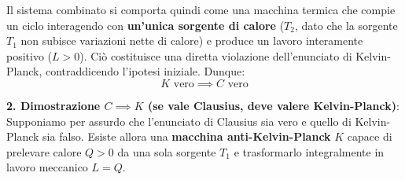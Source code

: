 Il sistema combinato si comporta quindi come una macchina termica che compie un ciclo interagendo con \textbf{un'unica sorgente di calore} ($T_2$, dato che la sorgente $T_1$ non subisce variazioni nette di calore) e produce un lavoro interamente positivo ($L > 0$). Ciò costituisce una diretta violazione dell'enunciato di Kelvin-Planck, contraddicendo l'ipotesi iniziale. Dunque:
\begin{equation}
    K \text{ vero} \implies C \text{ vero}
\end{equation}

\noindent \textbf{2. Dimostrazione $C \implies K$ (se vale Clausius, deve valere Kelvin-Planck)}: \\
Supponiamo per assurdo che l'enunciato di Clausius sia vero e quello di Kelvin-Planck sia falso.
Esiste allora una \textbf{macchina anti-Kelvin-Planck} $K$ capace di prelevare calore $Q > 0$ da una sola sorgente $T_1$ e trasformarlo integralmente in lavoro meccanico $L = Q$.

